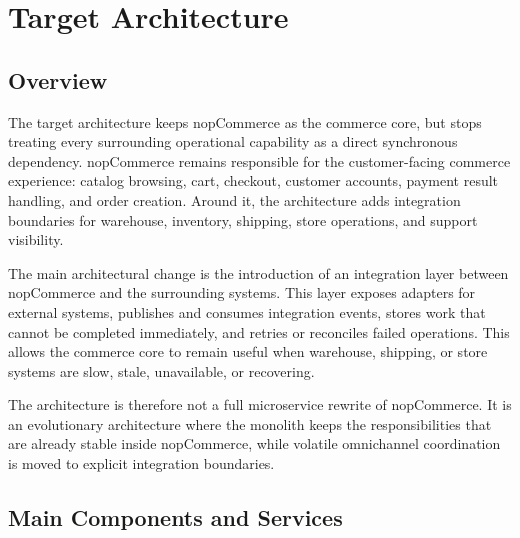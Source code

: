 \chapter{Target Architecture}

\section{Overview}

The target architecture keeps nopCommerce as the commerce core, but stops treating every
surrounding operational capability as a direct synchronous dependency. nopCommerce remains
responsible for the customer-facing commerce experience: catalog browsing, cart, checkout,
customer accounts, payment result handling, and order creation. Around it, the architecture adds
integration boundaries for warehouse, inventory, shipping, store operations, and support
visibility.

The main architectural change is the introduction of an integration layer between nopCommerce
and the surrounding systems. This layer exposes adapters for external systems, publishes and
consumes integration events, stores work that cannot be completed immediately, and retries or
reconciles failed operations. This allows the commerce core to remain useful when warehouse,
shipping, or store systems are slow, stale, unavailable, or recovering.

The architecture is therefore not a full microservice rewrite of nopCommerce. It is an
evolutionary architecture where the monolith keeps the responsibilities that are already stable
inside nopCommerce, while volatile omnichannel coordination is moved to explicit integration
boundaries.

\section{Main Components and Services}

